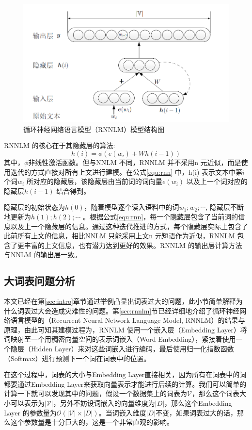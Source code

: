 \documentclass[12pt,a4paper]{article}
\begin{document}
\begin{figure}
  \centering
  \includegraphics[width=0.85\linewidth]{./figures/rnnlm.png}
  \caption{循环神经网络语言模型（RNNLM）模型结构图}\label{fig:rnnlm}
\end{figure}

RNNLM 的核心在于其隐藏层的算法:
\begin{equation}
\label{equ:rnn}
h(i) =\phi(e(w_i) +Wh(i -1))
\end{equation}
其中，$\phi$非线性激活函数。但与NNLM 不同，RNNLM 并不采用n 元近似，而是使用迭代的方式直接对所有上文进行建模。在公式\ref{equ:rnn} 中，h(i) 表示文本中第$i$ 个词$w_i$ 所对应的隐藏层，该隐藏层由当前词的词向量$e(w_i)$ 以及上一个词对应的隐藏层$h(i -1)$ 结合得到。

隐藏层的初始状态为$h(0)$，随着模型逐个读入语料中的词$w_1;w_2; \cdots $, 隐藏层不断地更新为$h(1);h(2); \cdots$ 。根据公式\ref{equ:rnn}，每一个隐藏层包含了当前词的信息以及上一个隐藏层的信息。通过这种迭代推进的方式，每个隐藏层实际上包含了此前所有上文的信息，相比NNLM 只能采用上文n 元短语作为近似，RNNLM 包含了更丰富的上文信息，也有潜力达到更好的效果。RNNLM 的输出层计算方法与NNLM 的输出层一致。


\subsection{大词表问题分析}
\label{sec:vocab}
本文已经在第\ref{sec:intro}章节通过举例凸显出词表过大的问题，此小节简单解释为什么词表过大会造成灾难性的问题。第\ref{sec:rnnlm}节已经详细地介绍了循环神经网络语言模型的（Recurrent Neural Network Language Model, RNNLM）的结果与原理，由此可知其建模过程为，RNNLM 使用一个嵌入层（Embedding Layer）将词映射至一个用稠密向量空间的表示词嵌入（Word Embedding），紧接着使用一个隐层（Hidden Layer）来对这些词嵌入进行编码，最后使用归一化指数函数（Softmax）进行预测下一个词在词表中的位置。

在这个过程中，词表的大小与Embedding Layer直接相关，因为所有在词表中的词都要通过Embedding Layer来获取向量表示才能进行后续的计算。我们可以简单的计算一下就可以发现其中的问题，假设一个数据集上的词表为$\mathcal{V}$，那么这个词表大小可以表示为${|\mathcal{V}|}$，另外不妨设词嵌入的向量维度为${|D|}$，那么这个Embedding Layer 的参数量为${\mathcal{O}(|\mathcal{V}| \times |D|)}$。当词嵌入维度${|D|}$不变，如果词表过大的话，那么这个参数量是十分巨大的，这是一个非常直观的影响。
\end{document}
